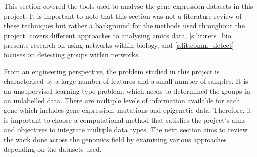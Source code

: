 This section covered the tools used to analyse the gene expression datasets in this project. It is important to note that this section was not a literature review of these techniques but rather a background for the methods used throughout the project.  covers different approaches to analysing omics data, \cref{s:lit:nets_bio} presents research on using networks within biology, and \cref{s:lit:comm_detect} focuses on detecting groups within networks.

From an engineering perspective, the problem studied in this project is characterised by a large number of features and a small number of samples. It is an unsupervised learning type problem, which needs to determined the groups in an unlabelled data. There are multiple levels of information available for each gene which includes gene expression, mutations and epigenetic data. Therefore, it is important to choose a computational method that satisfies the project's aims and objectives to integrate multiple data types. The next section aims to review the work done across the genomics field by examining various approaches depending on the datasets used.
